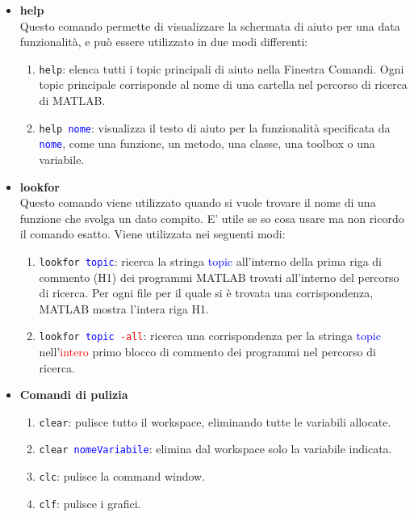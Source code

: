 \begin{itemize}
	
	\item 	\textbf{help} \\ 
		  	Questo comando permette di visualizzare la schermata di aiuto per una data funzionalità, e può essere 
		  	utilizzato in due modi differenti:
		  	\begin{enumerate}
		  	
				\item	\texttt{help}: elenca tutti i topic principali di aiuto nella Finestra Comandi. Ogni topic
						principale corrisponde al nome di una cartella nel percorso di ricerca di MATLAB.
						
				\item	\texttt{help \textcolor{blue}{nome}}: visualizza il testo di aiuto per la funzionalità 
						specificata da \texttt{\textcolor{blue}{nome}}, come una funzione, un metodo, una classe, 
						una toolbox o una variabile.
		  	
		  	\end{enumerate}
		  	
	\item	\textbf{lookfor} \\
			Questo comando viene utilizzato quando si vuole trovare il nome di una funzione che svolga un dato
			compito. E' utile se so cosa usare ma non ricordo il comando esatto. Viene utilizzata nei seguenti modi:
			\begin{enumerate}
			
				\item 	\texttt{lookfor \textcolor{blue}{topic}}: ricerca la stringa \textcolor{blue}{topic}
						all'interno della prima riga di commento (H1) dei programmi MATLAB trovati all'interno del
						percorso di ricerca. Per ogni file per il quale si è trovata una corrispondenza, MATLAB
						mostra l'intera riga H1.
						
				\item 	\texttt{lookfor \textcolor{blue}{topic} \textcolor{red}{-all}}: ricerca una corrispondenza 
						per la stringa \textcolor{blue}{topic} nell'\textcolor{red}{intero} primo blocco di 
						commento dei programmi nel percorso di ricerca.
			\end{enumerate}
        
    \item    \textbf{Comandi di pulizia}\\
            \begin{enumerate}
                \item \texttt{clear}: pulisce tutto il workspace, eliminando tutte le variabili allocate.
                \item \texttt{clear \textcolor{blue}{nomeVariabile}}: elimina dal workspace solo la variabile indicata.
                \item \texttt{clc}: pulisce la command window.
                \item \texttt{clf}: pulisce i grafici.
            \end{enumerate}
        

\end{itemize}
